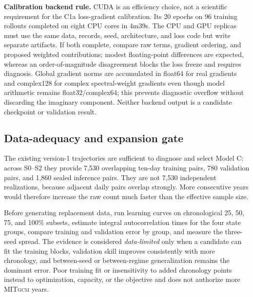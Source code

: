 \documentclass[11pt]{article}
\newcommand{\MITgcm}{\textsc{MITgcm}}
\begin{document}
\textbf{Calibration backend rule.}  CUDA is an efficiency choice, not a scientific
requirement for the C1a loss-gradient calibration.  Its 20 epochs on 96 training
rollouts completed on eight CPU cores in 4m39s.
The CPU and GPU replicas must use the same data, records, seed, architecture, and loss
code but write separate artifacts.  If both complete, compare raw terms, gradient
ordering, and proposed weighted contributions; modest floating-point differences are
expected, whereas an order-of-magnitude disagreement blocks the loss freeze and requires
diagnosis.  Global gradient norms are accumulated in float64 for real gradients and
complex128 for complex spectral-weight gradients even though model arithmetic remains
float32/complex64; this prevents diagnostic overflow without discarding the imaginary
component.  Neither backend output is a candidate checkpoint or validation result.

\subsection{Data-adequacy and expansion gate}

The existing version-1 trajectories are sufficient to diagnose and select Model C:
across S0--S2 they provide 7,530 overlapping ten-day training pairs, 780 validation
pairs, and 1,860 sealed inference pairs.  They are not 7,530 independent realizations,
because adjacent daily pairs overlap strongly.  More consecutive years would therefore
increase the raw count much faster than the effective sample size.

Before generating replacement data, run learning curves on chronological 25, 50, 75,
and 100\% subsets, estimate integral autocorrelation times for the four state groups,
compare training and validation error by group, and measure the three-seed spread.
The evidence is considered \emph{data-limited} only when a candidate can fit the training
blocks, validation skill improves consistently with more chronology, and between-seed
or between-regime generalization remains the dominant error.  Poor training fit or
insensitivity to added chronology points instead to optimization, capacity, or the
objective and does not authorize more \MITgcm{} years.
\end{document}
